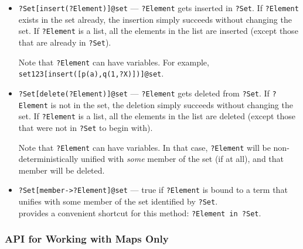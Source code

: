 \begin{itemize}
\item  \texttt{?Set[insert(?Element)]@\bs{}set} --- \texttt{?Element} gets
  inserted in \texttt{?Set}. If \texttt{?Element} exists in the set already,
  the insertion simply succeeds without changing the set.
  If \texttt{?Element} is a list, all the elements in the list are inserted
  (except those that are already in \texttt{?Set}).  

  Note that \texttt{?Element} can have variables. 
  For example, \texttt{set123[insert([p(a),q(1,?X)])]@\bs{}set}. 
\item \texttt{?Set[delete(?Element)]@\bs{}set} --- \texttt{?Element} gets
  deleted from \texttt{?Set}. If \texttt{?Element} is not in the set,
  the deletion simply succeeds without changing the set.
  If \texttt{?Element} is a list, all the elements in the list are deleted
  (except those that were not in \texttt{?Set} to begin with). 
  
  Note that \texttt{?Element} can have variables. In that case,
  \texttt{?Element} will be non-deterministically
  unified with \emph{some} member of the set (if
  at all), and that member will be deleted.  
\item \texttt{?Set[member->?Element]@\bs{}set} --- true if
  \texttt{?Element} is bound to a term that unifies with some member of the
  set identified by \texttt{?Set}.
  \\
  \ERGO provides a convenient shortcut for this method: \texttt{?Element
    \bs{}in ?Set}.  
\end{itemize}

\subsubsection{API for Working with Maps Only} \label{sec-api-map}

